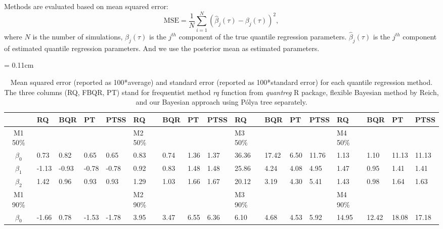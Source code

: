 \documentclass[12pt]{article}
\newcommand{\polya}{P\'{o}lya}
\begin{document}
Methods are evaluated based on mean squared error:
\begin{displaymath}
  \text{MSE}  =  \frac{1}{N}\sum_{i = 1}^N (\hat{\beta}_j(\tau) -
  \beta_j(\tau))^2 ,
\end{displaymath}
where $N$ is the number of simulations,
$\beta_j(\tau)$ is the $j^{th}$ component of the true quantile
regression parameters. $\hat{\beta}_j(\tau)$ is the $j^{th}$ component
of estimated quantile regression parameters. And we use the posterior
mean as estimated parameters.

\begin{landscape}
\begin{center}
  \begin{table}[h]
    \centering
    \caption[]{ Mean squared error (reported as 100*average) and standard
      error (reported as 100*standard error) for each
      quantile regression method.   The three
      columns (RQ, FBQR,
      PT) stand for frequentist method \textit{rq} function from
      \textit{quantreg} R package, flexible Bayesian method by Reich, and
      our Bayesian approach using \polya{} tree separately.}
    \vspace{4mm}
    \tabcolsep = 0.11cm
    \begin{tabular}[tb]{cllllllllllllllll}
      \toprule
            & RQ    & BQR   & PT    & PTSS  & RQ       & BQR   & PT    & PTSS  & RQ       & BQR   & PT    & PTSS    & RQ       & BQR   & PT    & PTSS   \\
  \hline
M1 50\%     &       &       &       &       & M2 50\%  &       &       &       & M3 50\%  &       &       & &M4 50\%  &         &       &                \\
 $\beta_0$  & 0.73  & 0.82  & 0.65  & 0.65  & 0.83     & 0.74  & 1.36  & 1.37  & 36.36    & 17.42 & 6.50  & 11.76   & 1.13     & 1.10  & 11.13 & 11.13  \\
  $\beta_1$ & -1.13 & -0.93 & -0.78 & -0.78 & 0.92     & 0.83  & 1.48  & 1.48  & 25.86    & 4.24  & 4.08  & 4.95    & 1.47     & 0.95  & 1.41  & 1.41   \\
  $\beta_2$ & 1.42  & 0.96  & 0.93  & 0.93  & 1.29     & 1.03  & 1.66  & 1.67  & 20.12    & 3.19  & 4.30  & 5.41    & 1.43     & 0.98  & 1.64  & 1.63   \\
M1 90\%     &       &       &       &       & M2 90\%  &       &       &       & M3 90\%  &       &       &         & M4 90\%  &       &       &        \\
 $\beta_0$  & -1.66 & 0.78  & -1.53 & -1.78 & 3.95     & 3.47  & 6.55  & 6.36  & 6.10     & 4.68  & 4.53  & 5.92    & 14.95    & 12.42 & 18.08 & 17.18  \\

\end{tabular}
\end{table}
\end{center}
\end{landscape}
\end{document}

